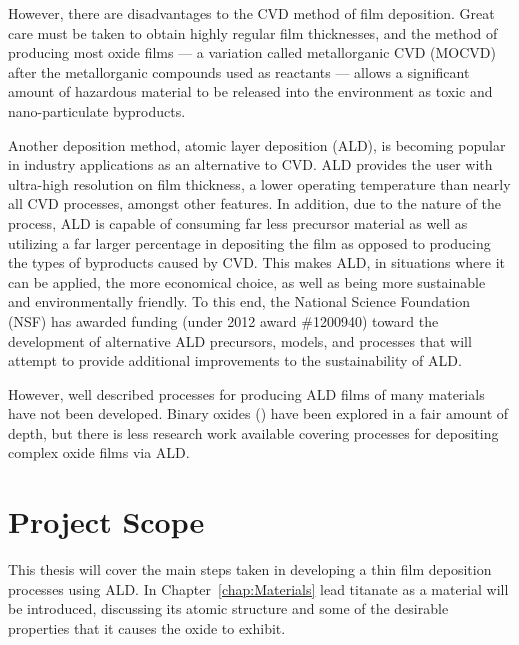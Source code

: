 However, there are disadvantages to the CVD method of film deposition. Great care must be taken to obtain highly regular film thicknesses, and the method of producing most oxide films --- a variation called metallorganic CVD (MOCVD) after the metallorganic compounds used as reactants --- allows a significant amount of hazardous material to be released into the environment as toxic and nano-particulate byproducts. 

Another deposition method, atomic layer deposition (ALD), is becoming popular in industry applications as an alternative to CVD. ALD provides the user with ultra-high resolution on film thickness, a lower operating temperature than nearly all CVD processes, amongst other features. In addition, due to the nature of the process, ALD is capable of consuming far less precursor material as well as utilizing a far larger percentage in depositing the film as opposed to producing the types of byproducts caused by CVD.\cite{ALD-Handbook} This makes ALD, in situations where it can be applied, the more economical choice, as well as being more sustainable and environmentally friendly. To this end, the National Science Foundation (NSF) has awarded funding (under 2012 award \#1200940) toward the development of alternative ALD precursors, models, and processes that will attempt to provide additional improvements to the sustainability of ALD.

However, well described processes for producing ALD films of many materials have not been developed. Binary oxides () have been explored in a fair amount of depth,\cite{chen_atomic_2007,de_ridder_growth_2002,knez_atomic_2006,lee_al2o3_2003,scheffe_atomic_2009} but there is less research work available covering processes for depositing complex oxide films via ALD. 


\section{Project Scope}
\label{sec:Intro-Scope}

This thesis will cover the main steps taken in developing a thin film deposition processes using ALD. In Chapter~\ref{chap:Materials} lead titanate as a material will be introduced, discussing its atomic structure and some of the desirable properties that it causes the oxide to exhibit. 

